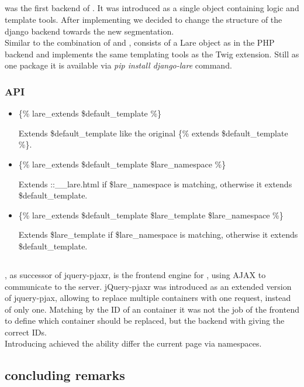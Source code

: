 \subsection{\djangoLare{}}

\djangoLare{} was the first backend of \lare{}.
It was introduced as a single object containing logic and template tools.
After implementing \phpLare{} we decided to change the structure of the django backend towards the new segmentation.
\\
Similar to the combination of \phpLare{} and \twigLare{}, \djangoLare{} consists of a Lare object as in the PHP backend and implements the same templating tools as the Twig extension.
Still as one package it is available via \emph{pip install django-lare} command.


\subsubsection{API}

\begin{itemize}
\item \{\% lare\_extends \$default\_template \%\}

Extends \$default\_template like the original \{\% extends \$default\_template \%\}.
\item \{\% lare\_extends \$default\_template \$lare\_namespace \%\}

Extends ::\_\_lare.html if \$lare\_namespace is matching, otherwise it extends \$default\_template.
\item \{\% lare\_extends \$default\_template \$lare\_template \$lare\_namespace \%\}

Extends \$lare\_template if \$lare\_namespace is matching, otherwise it extends \$default\_template.
\end{itemize}

\subsection{\lareJS{}}
\lareJS{}, as successor of jquery-pjaxr, is the frontend engine for \lare{}, using AJAX to communicate to the server.
jQuery-pjaxr was introduced as an extended version of jquery-pjax, allowing to replace multiple containers with one request, instead of only one.
Matching by the ID of an container it was not the job of the frontend to define which container should be replaced, but the backend with giving the correct IDs.
\\
Introducing \lareJS{} achieved the ability differ the current page via namespaces.


\subsection{concluding remarks}
